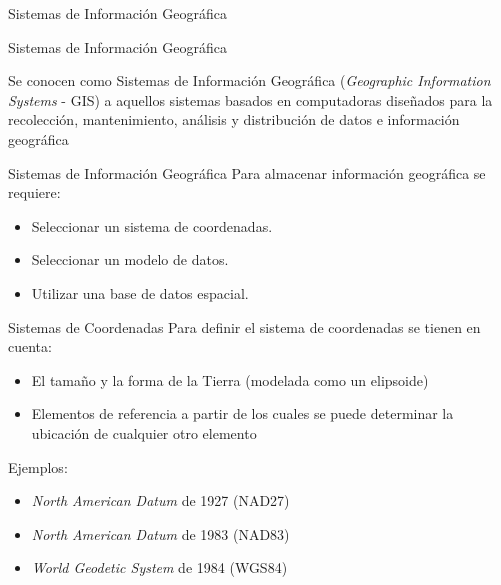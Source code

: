 \begin{frame}[c]
	\begin{center}
		\huge{Sistemas de Información Geográfica}
    \end{center}
\end{frame}

\begin{frame}[c]{Sistemas de Información Geográfica}
	\begin{center}
	 Se conocen como Sistemas de Información Geográfica (\emph{Geographic Information Systems} - GIS) a aquellos sistemas basados en computadoras diseñados para la recolección, mantenimiento, análisis y distribución de datos e información geográfica 	
	\end{center}
\end{frame}

\begin{frame}[c]{Sistemas de Información Geográfica}
	\large{Para almacenar información geográfica se requiere:}
	\vspace{\baselineskip}
	\begin{center}
		\begin{itemize}	 	
			\item Seleccionar un sistema de coordenadas.
			\item Seleccionar un modelo de datos.
			\item Utilizar una base de datos espacial.
		\end{itemize}			
	\end{center}
\end{frame}

\begin{frame}[c]{Sistemas de Coordenadas}
	Para	definir el sistema de coordenadas se tienen en cuenta:
	\vspace{\baselineskip}
	\begin{itemize}	 	
		\item El tamaño y la forma de la Tierra (modelada como un elipsoide)	
		\item Elementos de
		referencia a partir de los cuales se puede determinar la ubicación de cualquier otro elemento
	\end{itemize}			
	\vspace{\baselineskip}	
	Ejemplos:
	\vspace{\baselineskip}
	\begin{itemize}	 	
		\item \emph{North American
		Datum} de 1927 (NAD27)
		\item \emph{North American Datum} de 1983
		(NAD83)
		\item \emph{World Geodetic System} de 1984 (WGS84)
	\end{itemize}			
\end{frame}

